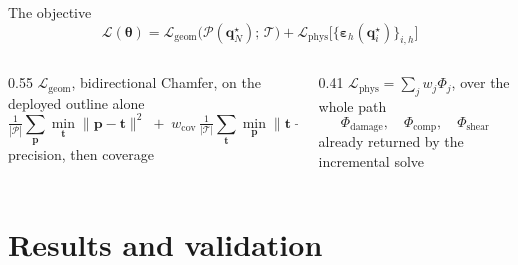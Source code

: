 \documentclass[aspectratio=169,11pt]{beamer}
\begin{document}
%
\begin{frame}{The objective}
  \setlength{\abovedisplayskip}{1.2mm}\setlength{\belowdisplayskip}{1.2mm}%
  \setlength{\abovedisplayshortskip}{0.9mm}\setlength{\belowdisplayshortskip}{0.9mm}%
  {\small
   \[ \mathcal{L}(\bm\theta)
      = \mathcal{L}_{\mathrm{geom}}\bigl(\mathcal{P}(\bm q^\star_N);\,\mathcal{T}\bigr)
      + \mathcal{L}_{\mathrm{phys}}\bigl[\{\bm\varepsilon_h(\bm q^\star_i)\}_{i,h}\bigr] \]}
  \begin{columns}[t,onlytextwidth]
    \begin{column}{0.55\textwidth}
      {\footnotesize
       $\mathcal{L}_{\mathrm{geom}}$, bidirectional Chamfer, on the deployed outline alone
       \[ \tfrac{1}{|\mathcal{P}|}\textstyle\sum_{\bm p}\min_{\bm t}\lVert\bm p-\bm t\rVert^{2}
          \;+\; w_{\mathrm{cov}}\,\tfrac{1}{|\mathcal{T}|}
          \textstyle\sum_{\bm t}\min_{\bm p}\lVert\bm t-\bm p\rVert^{2} \]
       \vspace{-1mm}
       precision, then coverage}
    \end{column}\hfill
    \begin{column}{0.41\textwidth}
      {\footnotesize
       $\mathcal{L}_{\mathrm{phys}}=\sum_j w_j\Phi_j$, over the whole path
       \[ \Phi_{\mathrm{damage}},\quad \Phi_{\mathrm{comp}},\quad \Phi_{\mathrm{shear}} \]
       \vspace{-1mm}
       already returned by the incremental solve}
    \end{column}
  \end{columns}
\end{frame}

\section{Results and validation}
\sectionslide{}
\end{document}
